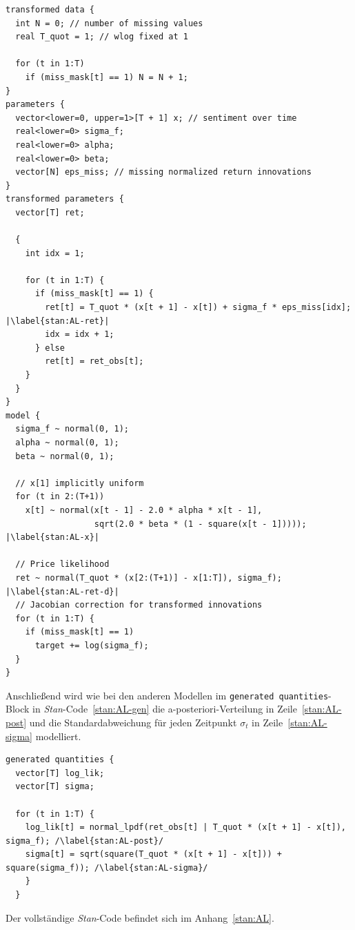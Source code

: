 \documentclass[ngerman]{ttlab-qualify}
\begin{document}
\begin{lstlisting}[style=custom, escapechar=|,caption={Teil-Modell nach \parencite{bertschinger:2019, AL:2008}}, label= {stan:AL-param}]
transformed data {
  int N = 0; // number of missing values
  real T_quot = 1; // wlog fixed at 1
  
  for (t in 1:T)
    if (miss_mask[t] == 1) N = N + 1;
}
parameters {
  vector<lower=0, upper=1>[T + 1] x; // sentiment over time
  real<lower=0> sigma_f;
  real<lower=0> alpha;
  real<lower=0> beta;
  vector[N] eps_miss; // missing normalized return innovations
}
transformed parameters {
  vector[T] ret;
  
  {
    int idx = 1;
    
    for (t in 1:T) {
      if (miss_mask[t] == 1) {
        ret[t] = T_quot * (x[t + 1] - x[t]) + sigma_f * eps_miss[idx]; |\label{stan:AL-ret}|
        idx = idx + 1;
      } else
        ret[t] = ret_obs[t];
    }
  }
}
model {
  sigma_f ~ normal(0, 1);
  alpha ~ normal(0, 1);
  beta ~ normal(0, 1);

  // x[1] implicitly uniform
  for (t in 2:(T+1))
    x[t] ~ normal(x[t - 1] - 2.0 * alpha * x[t - 1],
                  sqrt(2.0 * beta * (1 - square(x[t - 1])))); |\label{stan:AL-x}|
                  
  // Price likelihood
  ret ~ normal(T_quot * (x[2:(T+1)] - x[1:T]), sigma_f); |\label{stan:AL-ret-d}|
  // Jacobian correction for transformed innovations
  for (t in 1:T) {
    if (miss_mask[t] == 1)
      target += log(sigma_f);
  }
}

\end{lstlisting}

Anschließend wird wie bei den anderen Modellen im \verb|generated quantities|-Block in \textit{Stan}-Code~\ref{stan:AL-gen} die a-posteriori-Verteilung in Zeile~\ref{stan:AL-post} und die Standardabweichung für jeden Zeitpunkt $\sigma_t$ in Zeile~\ref{stan:AL-sigma} modelliert.
\begin{lstlisting}[style=custom, escapechar=/,caption={Teil-Modell nach \parencite{bertschinger:2019, AL:2008}}, label= {stan:AL-gen}]
generated quantities {
  vector[T] log_lik;
  vector[T] sigma; 
           
  for (t in 1:T) {
    log_lik[t] = normal_lpdf(ret_obs[t] | T_quot * (x[t + 1] - x[t]), sigma_f); /\label{stan:AL-post}/
    sigma[t] = sqrt(square(T_quot * (x[t + 1] - x[t])) + square(sigma_f)); /\label{stan:AL-sigma}/
    }
  }
\end{lstlisting}

Der vollständige \textit{Stan}-Code befindet sich im Anhang~\ref{stan:AL}.
\end{document}
